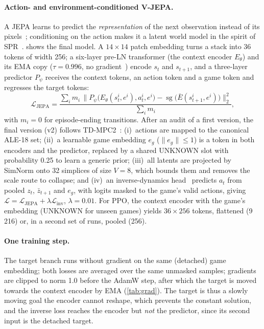 \documentclass[runningheads]{llncs}
\begin{document}
\paragraph{Action- and environment-conditioned V-JEPA.}
A JEPA learns to predict the \emph{representation} of the next observation instead of its
pixels~\cite{lecun2022path}; conditioning on the action makes it a latent world model in the
spirit of SPR~\cite{schwarzer2021spr}.  shows the final model. A $14\times14$
patch embedding turns a stack into 36 tokens of width 256; a
six-layer pre-LN transformer (the context encoder $E_\theta$) and its EMA copy ($\tau=0.996$,
no gradient~\cite{assran2023ijepa}) encode $s_t$ and $s_{t+1}$, and a three-layer
predictor $P_\psi$ receives the context tokens, an action token and a game token and regresses
the target tokens:
\begin{equation}
  \mathcal{L}_{\text{JEPA}}=\frac{\sum_i m_i\,\big\|P_\psi\big(E_\theta(s_t^i,e^i),a_t^i,e^i\big)
  -\operatorname{sg}\big(\bar E(s_{t+1}^i,e^i)\big)\big\|_2^2}{\sum_i m_i},
\end{equation}
with $m_i=0$ for episode-ending transitions. After an audit of a first version, the final version (v2) follows TD-MPC2~\cite{hansen2024tdmpc2}: (i)~actions are mapped to the canonical ALE-18 set; (ii)~a learnable game embedding
$e_g$ ($\|e_g\|\le1$) is a token in both encoders and the predictor, replaced by a shared
UNKNOWN slot with probability 0.25 to learn a generic prior; (iii)~all latents are projected
by SimNorm onto 32 simplices of size $V=8$, which bounds them and removes the scale route to
collapse; and (iv)~an inverse-dynamics head~\cite{pathak2017icm} predicts $a_t$ from pooled
$z_t$, $\bar z_{t+1}$ and $e_g$, with logits masked to the game's valid actions, giving
$\mathcal{L}=\mathcal{L}_{\text{JEPA}}+\lambda\mathcal{L}_{\text{inv}}$, $\lambda=0.01$. For PPO,
the context encoder with the game's embedding (UNKNOWN for unseen games) yields
$36\times256$ tokens, flattened (9\,216) or, in a second set of runs, pooled (256).

\paragraph{One training step.} The target branch runs without gradient on the same (detached)
game embedding; both losses are averaged over the same unmasked samples; gradients are clipped
to norm 1.0 before the AdamW step, after which the target is moved towards the context
encoder by EMA (\cref{tab:grad}). The target is thus a slowly moving goal the encoder cannot
reshape, which prevents the constant solution, and the inverse loss reaches the encoder but
\emph{not} the predictor, since its second input is the detached target.
\end{document}

